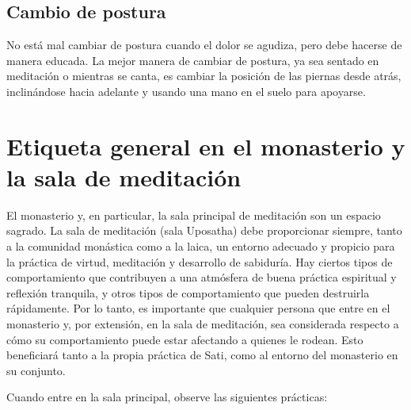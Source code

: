 \subsection{Cambio de postura}


No está mal cambiar de postura cuando el dolor se agudiza, pero debe hacerse de manera educada. La mejor manera de cambiar de postura, ya sea sentado en meditación o mientras se canta, es cambiar la posición de las piernas desde atrás, inclinándose hacia adelante y usando una mano en el suelo para apoyarse.
\clearpage

\section{Etiqueta general en el monasterio y la sala de meditación}

El monasterio y, en particular, la sala principal de meditación son un espacio sagrado. La sala de meditación (sala Uposatha) debe proporcionar siempre, tanto a la comunidad monástica como a la laica, un entorno adecuado y propicio para la práctica de virtud, meditación y desarrollo de sabiduría. Hay ciertos tipos de comportamiento que contribuyen a una atmósfera de buena práctica espiritual y reflexión tranquila, y otros tipos de comportamiento que pueden destruirla rápidamente. Por lo tanto, es importante que cualquier persona que entre en el monasterio y, por extensión, en la sala de meditación, sea considerada respecto a cómo su comportamiento puede estar afectando a quienes le rodean. Esto beneficiará tanto a la propia práctica de Sati, como al entorno del monasterio en su conjunto.

Cuando entre en la sala principal, observe las siguientes prácticas:


